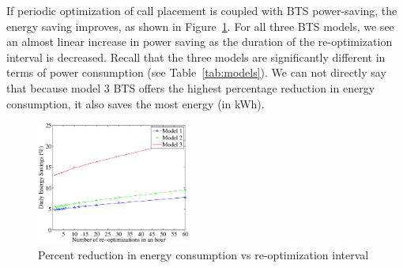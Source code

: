 If periodic optimization of call placement is coupled with BTS power-saving, the energy saving improves, as shown in Figure~\ref{fig:results2}.
%
For all three BTS models, we see an almost linear increase in power saving as the duration of the re-optimization interval is decreased. Recall that the three models are significantly different in terms of power consumption (see Table~\ref{tab:models}). We can not directly say that because model 3 BTS offers the highest percentage reduction in energy consumption, it also saves the most energy (in kWh). %


\begin{figure}
\includegraphics[width=0.45\textwidth]{figures/percent.savings.powersaving.eps}
\caption{Percent reduction in energy consumption vs re-optimization interval}
\label{fig:results2}
\end{figure}

